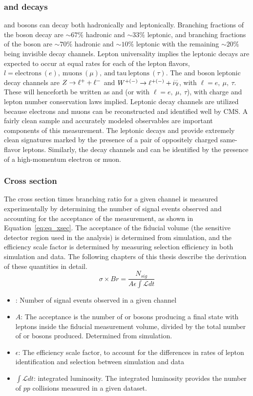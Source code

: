 \subsubsection{\W and \Z decays}
\W and \Z bosons can decay both hadronically and leptonically. Branching fractions of the \W boson decay are $\sim67\%$ hadronic and $\sim33\%$ leptonic, and branching fractions of the \Z boson are $\sim70\%$ hadronic and $\sim10\%$ leptonic with the remaining $\sim 20\%$ being invisible decay channels\cite{PhysRevD.98.030001}. Lepton universality implies the leptonic decays are expected to occur at equal rates for each of the lepton flavors, $l=\mathrm{electrons}~ (e),~\mathrm{muons}~(\mu),~\mathrm{and~tau~leptons}~ (\tau)$. The \W and \Z boson leptonic decay channels are $Z \to \ell^+ + \ell^-$ and $\W^{+(-)} \to \ell^{+(-)} +  \overset{\textbf{\fontsize{2pt}{2pt}\selectfont(---)}}{\nu_\ell}$, with $\ell=e,~\mu,~\tau$. These will henceforth be written as \zll and \wlnu (or with $\ell=e,~\mu,~\tau$), with charge and lepton number conservation laws implied.
Leptonic decay channels are utilized because electrons and muons can be reconstructed and identified well by CMS. A fairly clean sample and accurately modeled observables are important components of this measurement. The leptonic decays \zee and \zmm provide extremely clean signatures marked by the presence of a pair of oppositely charged same-flavor leptons. Similarly, the decay channels \wenu and \wmunu can be identified by the presence of a high-momentum electron or muon. 
\subsubsection{Cross section}
The cross section times branching ratio for a given channel is measured experimentally by determining the number of signal events observed and accounting for the acceptance of the measurement, as shown in Equation~\ref{eq:eq_xsec}. The acceptance of the fiducial volume (the sensitive detector region used in the analysis) is determined from simulation, and the efficiency scale factor is determined by measuring selection efficiency in both simulation and data. The following chapters of this thesis describe the derivation of these quantities in detail.
\begin{equation}\label{eq:eq_xsec}
\sigma\times Br = \frac{N_{sig}}{A\epsilon \int\mathcal{L} dt}
\end{equation}
\begin{itemize}
\item \nsig: Number of signal events observed in a given channel
\item $A$: The acceptance is the number of \W or \Z bosons producing a final state with leptons inside the fiducial measurement volume, divided by the total number of \W or \Z bosons produced. Determined from simulation. 
\item $\epsilon$: The efficiency scale factor, to account for the differences in rates of lepton identification and selection between simulation and data
\item $\int\mathcal{L}dt$: integrated luminosity. The integrated luminosity provides the number of $pp$ collisions measured in a given dataset.
\end{itemize}

